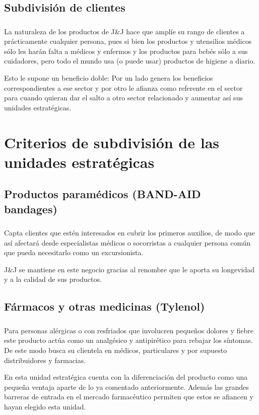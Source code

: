 \documentclass[compress, aspectratio=169]{beamer} %
\begin{document}
	\subsection{Subdivisión de clientes}
		\begin{frame}
			\frametitle{\insertsubsection}
			La naturaleza de los productos de J\&J hace que amplíe su rango de clientes a prácticamente cualquier
			persona, pues si bien los productos y utensilios médicos sólo les harán falta a médicos y enfermos
			y los productos para bebés sólo a sus cuidadores, pero todo el mundo usa (o puede usar) productos
			de higiene a diario.
			
			\pause
			
			Esto le supone un beneficio doble: Por un lado genera los beneficios correspondientes a ese sector
			y por otro le afianza como referente en el sector para cuando quieran dar el salto a otro sector
			relacionado y aumentar así sus unidades estratégicas.
		\end{frame}

\section{Criterios de subdivisión de las unidades estratégicas}
	\begin{frame}
		\huge\centerline{\insertsection}
	\end{frame}
	
	\subsection{Productos paramédicos (BAND-AID bandages)}
		\begin{frame}
			\frametitle{\insertsubsection}
			Capta clientes que estén interesados en cubrir los primeros auxilios, de modo que así afectará
			desde especialistas médicos o socorristas a cualquier persona común que pueda necesitarlo como
			un excursionista.
			
			J\&J se mantiene en este negocio gracias al renombre que le aporta su longevidad y a la calidad
			de sus productos.
			
		\end{frame}

	\subsection{Fármacos y otras medicinas (Tylenol)}
		\begin{frame}
			\frametitle{\insertsubsection}
			Para personas alérgicas o con resfriados que involucren pequeños dolores y fiebre este producto
			actúa como un analgésico y antipirético para rebajar los síntomas. De este modo busca su
			clientela en médicos, particulares y por supuesto distribuidores y farmacias.
			
			En esta unidad estratégica cuenta con la diferenciación del producto como una pequeña ventaja
			aparte de lo ya comentado anteriormente. Además las grandes barreras de entrada en el mercado
			farmacéutico permiten que estos se afiancen y hayan elegido esta unidad.
		\end{frame}
	
\end{document}
